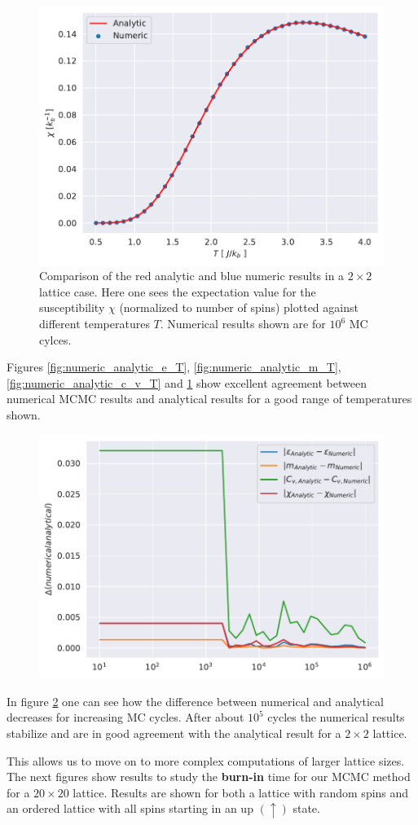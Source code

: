 \documentclass[english,notitlepage,reprint,nofootinbib]{revtex4-1}  %
\begin{document}
\begin{figure}[H]
    \centering
    \includegraphics[width=.5\textwidth]{../figures/numeric_analytic_X_T.pdf}
    \caption{Comparison of the red analytic and blue numeric results in a $2\times2$ lattice case. Here one sees the expectation value for the susceptibility $\chi$ (normalized to number of spins) plotted against different temperatures $T$. Numerical results shown are for $10^6$ MC cylces.}
    \label{fig:numeric_analytic_X_T}
\end{figure}
Figures \ref{fig:numeric_analytic_e_T}, \ref{fig:numeric_analytic_m_T}, \ref{fig:numeric_analytic_c_v_T} and \ref{fig:numeric_analytic_X_T} show excellent agreement between numerical MCMC results and analytical results for a good range of temperatures shown. 

\begin{figure}[H]
    \centering
    \includegraphics[width=.5\textwidth]{../figures/numeric_analytic.pdf}
    \caption{}
    \label{fig:numeric_analytic}
\end{figure}
In figure \ref{fig:numeric_analytic} one can see how the difference between numerical and analytical decreases for increasing MC cycles. After about $10^{5}$ cycles the numerical results stabilize and are in good agreement with the analytical result for a $2 \times 2$ lattice. 

This allows us to move on to more complex computations of larger lattice sizes. The next figures show results to study the \textbf{burn-in} time for our MCMC method for a $20 \times 20$ lattice. Results are shown for both a lattice with random spins and an ordered lattice with all spins starting in an up $(\uparrow)$ state.
\end{document}
